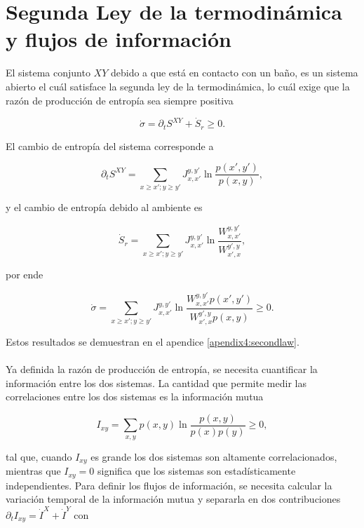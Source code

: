 \label{sec4:flujos}
\section{Segunda Ley de la termodinámica y flujos de información}
El sistema conjunto $XY$ debido a que está en contacto con un baño, es un sistema abierto el cuál satisface la segunda ley de la termodinámica, lo cuál exige que la razón de producción de entropía sea siempre positiva

\begin{equation*}
    \dot{\sigma} = \partial_{t}S^{XY} + \dot{S}_{r} \geq 0. 
\end{equation*}

El cambio de entropía del sistema corresponde a 

\begin{equation*}
    \partial_{t}S^{XY} = \sum_{x\geq x'; y\geq y'} J_{x,x'}^{y,y'} \ln \frac{p(x',y')}{p(x,y)},
\end{equation*}

y el cambio de entropía debido al ambiente es

\begin{equation*}
    \dot{S}_{r} = \sum_{x\geq x'; y\geq y'} J_{x,x'}^{y,y'} \ln \frac{W_{x,x'}^{y,y'}}{W_{x',x}^{y',y}},
\end{equation*}

por ende

\begin{equation*}
    \dot{\sigma} = \sum_{x\geq x'; y\geq y'} J_{x,x'}^{y,y'} \ln \frac{ W_{x,x'}^{y,y'}p(x',y')  }{ W_{x',x}^{y',y}p(x,y) } \geq 0.
\end{equation*}

Estos resultados se demuestran en el apendice \ref{apendix4:secondlaw}. \\ 
\\
Ya definida la razón de producción de entropía, se necesita cuantificar la información entre los dos sistemas. La cantidad que permite medir las correlaciones entre los dos sistemas es la información mutua

\begin{equation*}
    I_{xy} = \sum_{x,y} p(x,y) \ln \frac{p(x,y)}{p(x)p(y)} \geq 0, 
\end{equation*}

tal que, cuando $I_{xy}$ es grande los dos sistemas son altamente correlacionados, mientras que $I_{xy}=0$ significa que los sistemas son estadísticamente independientes. Para definir los flujos de información, se necesita calcular la variación temporal de la información mutua y separarla en dos contribuciones $\partial_{t} I_{xy} = \dot{I}^{X} + \dot{I}^{Y}$ con

